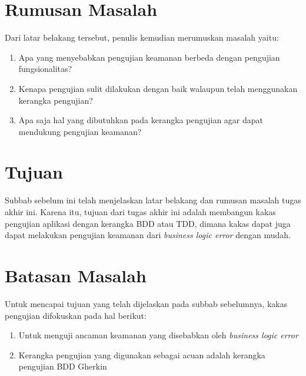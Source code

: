 \section{Rumusan Masalah}

Dari latar belakang tersebut, penulis kemudian merumuskan masalah yaitu:

\begin{enumerate}
    \item Apa yang menyebabkan pengujian keamanan berbeda dengan pengujian fungsionalitas?
    \item Kenapa pengujian sulit dilakukan dengan baik walaupun telah menggunakan kerangka pengujian?
    \item Apa saja hal yang dibutuhkan pada kerangka pengujian agar dapat mendukung pengujian keamanan?
\end{enumerate}

\section{Tujuan}

Subbab sebelum ini telah menjelaskan latar belakang dan rumusan masalah tugas akhir ini.
Karena itu, tujuan dari tugas akhir ini adalah membangun kakas pengujian aplikasi
dengan kerangka BDD atau TDD, dimana kakas dapat juga dapat melakukan pengujian
keamanan dari \emph{business logic error} dengan mudah.

\section{Batasan Masalah}

Untuk mencapai tujuan yang telah dijelaskan pada subbab sebelumnya, kakas pengujian difokuskan pada hal berikut:

\begin{enumerate}
    \item Untuk menguji ancaman keamanan yang disebabkan oleh \emph{business logic error}
    \item Kerangka pengujian yang digunakan sebagai acuan adalah kerangka pengujian BDD Gherkin
\end{enumerate}

